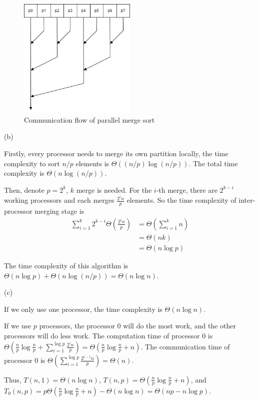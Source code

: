 \begin{figure}
    \centering
    \includegraphics[width=0.5\textwidth]{fig-dataflow.png}
    \caption{Communication flow of parallel merge sort}
    \label{fig:communication-flow}
\end{figure}

\noindent(b)

Firstly, every processor needs to merge its own partition locally, the time complexity to sort $n/p$ elements is $\Theta((n/p)\log(n/p))$. The total time complexity is $\Theta(n\log(n/p))$.

Then, denote $p=2^k$, $k$ merge is needed. For the $i$-th merge, there are $2^{k-i}$ working processors and each merges $\frac{2^in}{p}$ elements. So the time complexity of inter-processor merging stage is
\begin{align*}
    \sum_{i=1}^k 2^{k-i}\Theta\left(\frac{2^in}{p}\right) &= \Theta\left(\sum_{i=1}^k n\right)\\
    &= \Theta\left(nk \right)\\
    &= \Theta(n\log p)
\end{align*}

The time complexity of this algorithm is $\Theta(n\log p)+\Theta(n\log(n/p))=\Theta(n\log n)$.

\noindent(c)

If we only use one processor, the time complexity is $\Theta(n\log n)$.

If we use $p$ processors, the processor $0$ will do the most work, and the other processors will do less work. The computation time of processor $0$ is $\Theta\left(\frac{n}{p}\log\frac{n}{p}+\sum_{i=1}^{\log p}\frac{2^in}{p}\right)=\Theta\left(\frac{n}{p}\log\frac{n}{p}+n\right)$. The communication time of processor $0$ is $\Theta\left(\sum_{i=1}^{\log p}\frac{2^{i-1}n}{p}\right)=\Theta(n)$. 

Thus, $T(n,1)=\Theta(n\log n)$, $T(n,p)=\Theta\left(\frac{n}{p}\log\frac{n}{p}+n\right)$, and $T_0(n,p)=p\Theta\left(\frac{n}{p}\log\frac{n}{p}+n\right)-\Theta(n\log n)=\Theta(np-n\log p)$. 

